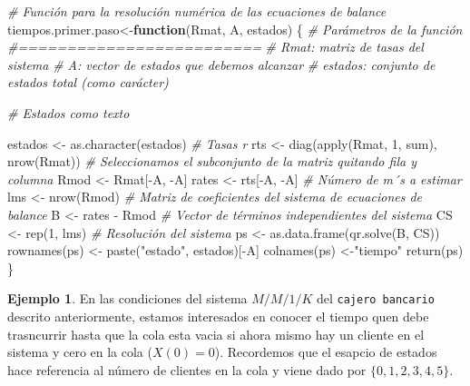 \documentclass[
]{book}
\newenvironment{Shaded}{\begin{snugshade}}{\end{snugshade}}
\newcommand{\CommentTok}[1]{\textcolor[rgb]{0.56,0.35,0.01}{\textit{#1}}}
\newcommand{\ControlFlowTok}[1]{\textcolor[rgb]{0.13,0.29,0.53}{\textbf{#1}}}
\newcommand{\DecValTok}[1]{\textcolor[rgb]{0.00,0.00,0.81}{#1}}
\newcommand{\FunctionTok}[1]{\textcolor[rgb]{0.00,0.00,0.00}{#1}}
\newcommand{\NormalTok}[1]{#1}
\newcommand{\OtherTok}[1]{\textcolor[rgb]{0.56,0.35,0.01}{#1}}
\newcommand{\SpecialCharTok}[1]{\textcolor[rgb]{0.00,0.00,0.00}{#1}}
\newcommand{\StringTok}[1]{\textcolor[rgb]{0.31,0.60,0.02}{#1}}
\theoremstyle{definition}
\theoremstyle{definition}
\newtheorem{example}{Ejemplo}[chapter]
\theoremstyle{definition}
\theoremstyle{definition}
\theoremstyle{remark}
\begin{document}
\begin{Shaded}
\begin{Highlighting}[]
\CommentTok{\# Función para la resolución numérica de las ecuaciones de balance}
\NormalTok{tiempos.primer.paso}\OtherTok{\textless{}{-}}\ControlFlowTok{function}\NormalTok{(Rmat, A, estados)}
\NormalTok{\{}
  \CommentTok{\# Parámetros de la función}
  \CommentTok{\#=========================}
  \CommentTok{\# Rmat: matriz de tasas del sistema}
  \CommentTok{\# A: vector de estados que debemos alcanzar}
  \CommentTok{\# estados: conjunto de estados total (como carácter)}
  
  \CommentTok{\# Estados como texto}
  
\NormalTok{  estados }\OtherTok{\textless{}{-}} \FunctionTok{as.character}\NormalTok{(estados)}
  \CommentTok{\# Tasas r}
\NormalTok{  rts }\OtherTok{\textless{}{-}} \FunctionTok{diag}\NormalTok{(}\FunctionTok{apply}\NormalTok{(Rmat, }\DecValTok{1}\NormalTok{, sum), }\FunctionTok{nrow}\NormalTok{(Rmat))}
  \CommentTok{\# Seleccionamos el subconjunto de la matriz quitando fila y columna}
\NormalTok{  Rmod }\OtherTok{\textless{}{-}}\NormalTok{ Rmat[}\SpecialCharTok{{-}}\NormalTok{A, }\SpecialCharTok{{-}}\NormalTok{A]}
\NormalTok{  rates }\OtherTok{\textless{}{-}}\NormalTok{ rts[}\SpecialCharTok{{-}}\NormalTok{A, }\SpecialCharTok{{-}}\NormalTok{A]}
  \CommentTok{\# Número de m´s a estimar}
\NormalTok{  lms }\OtherTok{\textless{}{-}} \FunctionTok{nrow}\NormalTok{(Rmod)}
  \CommentTok{\# Matriz de coeficientes del sistema de ecuaciones de balance}
\NormalTok{  B }\OtherTok{\textless{}{-}}\NormalTok{ rates }\SpecialCharTok{{-}}\NormalTok{ Rmod}
  \CommentTok{\# Vector de términos independientes del sistema}
\NormalTok{  CS }\OtherTok{\textless{}{-}} \FunctionTok{rep}\NormalTok{(}\DecValTok{1}\NormalTok{, lms)}
  \CommentTok{\# Resolución del sistema}
\NormalTok{  ps }\OtherTok{\textless{}{-}} \FunctionTok{as.data.frame}\NormalTok{(}\FunctionTok{qr.solve}\NormalTok{(B, CS))}
  \FunctionTok{rownames}\NormalTok{(ps) }\OtherTok{\textless{}{-}} \FunctionTok{paste}\NormalTok{(}\StringTok{"estado"}\NormalTok{, estados)[}\SpecialCharTok{{-}}\NormalTok{A]}
  \FunctionTok{colnames}\NormalTok{(ps) }\OtherTok{\textless{}{-}}\StringTok{"tiempo"}
  \FunctionTok{return}\NormalTok{(ps)}
\NormalTok{\}}
\end{Highlighting}
\end{Shaded}

\begin{example}
En las condiciones del sistema \(M/M/1/K\) del \texttt{cajero\ bancario} descrito anteriormente, estamos interesados en conocer el tiempo quen debe trasncurrir hasta que la cola esta vacia si ahora mismo hay un cliente en el sistema y cero en la cola (\(X(0) = 0\)). Recordemos que el esapcio de estados hace referencia al número de clientes en la cola y viene dado por \(\{0, 1, 2, 3, 4, 5\}.\)
\end{example}
\end{document}
